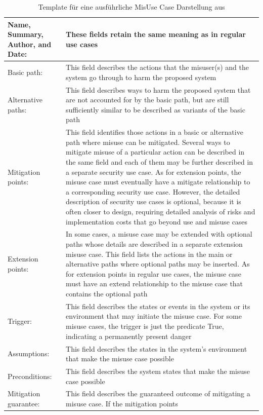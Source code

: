 \begin{table}
\scriptsize
\centering
\caption{Template für eine ausführliche MisUse Case Darstellung aus \cite{sindre2005eliciting}}
\label{tab:MisuseCaseTemplate}
\begin{tabular}{p{}p{}}
\hline 
Name, Summary, Author,
and Date: & These fields retain the same meaning as in regular use cases \\ 
\hline 
Basic path: & This field describes the actions that the misuser(s) and the system go through to harm the
proposed system \\ 
\hline 
Alternative paths: & This field describes ways to harm the proposed system that are not accounted for by the basic path,
but are still sufficiently similar to be described as variants of the basic path \\ 
\hline 
Mitigation points: & This field identifies those actions in a basic or alternative path where misuse can be mitigated.
Several ways to mitigate misuse of a particular action can be described in the same field and
each of them may be further described in a separate security use case. As for extension
points, the misuse case must eventually have a mitigate relationship to a corresponding
security use case. However, the detailed description of security use cases is optional, because
it is often closer to design, requiring detailed analysis of risks and implementation
costs that go beyond use and misuse cases \\ 
\hline 
Extension points: & In some cases, a misuse case may be extended with optional paths whose details are described
in a separate extension misuse case. This field lists the actions in the main or alternative paths
where optional paths may be inserted. As for extension points in regular use cases, the misuse
case must have an extend relationship to the misuse case that contains the optional path \\ 
\hline 
Trigger: & This field describes the states or events in the system or its environment that may initiate the
misuse case. For some misuse cases, the trigger is just the predicate True, indicating
a permanently present danger \\ 
\hline 
Assumptions: & This field describes the states in the system’s environment that make the misuse case possible \\ 
\hline 
Preconditions: & This field describes the system states that make the misuse case possible \\ 
\hline 
Mitigation guarantee: & This field describes the guaranteed outcome of mitigating a misuse case. If the mitigation points

\end{tabular}
\end{table}
